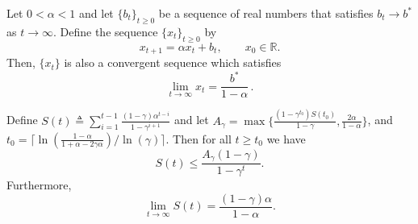 \documentclass[10pt,a4paper]{amsart}
\begin{document}
\begin{lemma}
\label{lemma:convergent_seq}
Let $0<\alpha<1$ and let $\{b_t\}_{t\ge0}$ be a sequence of real numbers that satisfies $b_t\to b^*$ as $t \to \infty$.
Define the sequence $\{x_t\}_{t\ge0}$ by
$$
x_{t+1}=\alpha x_t+ b_t,\qquad x_0\in\mathbb{R}.
$$
Then, $\{x_t\}$ is also a convergent sequence which satisfies 
\[
\lim_{t\to\infty}x_t =\frac{b^*}{1-\alpha}\,.
\]
\end{lemma}

\begin{prop}
\label{prop:discount_sum}
Define $S(t) \triangleq \sum_{i=1}^{t-1}  \frac{(1-\gamma)\alpha^{t-i}}{1 - \gamma^{i+1}
    }$ and let $A_\gamma=\max\{\frac{(1-\gamma^{t_0})S(t_0)}{1-\gamma}, \frac{2\alpha}{1-\alpha}\}$, and  $ t_0= \lceil\ln(\frac{1-\alpha}{1+\alpha-2\gamma\alpha})/\ln(\gamma)\rceil$. Then for all $t\geq t_0 $ we have     
$$ S(t) \leq \frac{A_\gamma(1-\gamma)}{1-\gamma^t}. $$ 
Furthermore, $$\lim_{t \to \infty} S(t) = \frac{(1-\gamma)\alpha}{1-\alpha}.$$
\end{prop}
\end{document}
